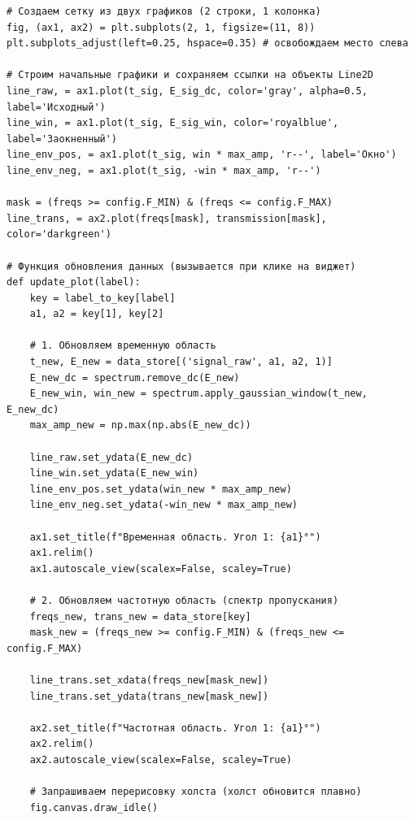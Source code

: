 \begin{listing}[H]
	\caption{Логика обновления сетки графиков ()}
	\begin{verbatim}
# Создаем сетку из двух графиков (2 строки, 1 колонка)
fig, (ax1, ax2) = plt.subplots(2, 1, figsize=(11, 8))
plt.subplots_adjust(left=0.25, hspace=0.35) # освобождаем место слева

# Строим начальные графики и сохраняем ссылки на объекты Line2D
line_raw, = ax1.plot(t_sig, E_sig_dc, color='gray', alpha=0.5, label='Исходный')
line_win, = ax1.plot(t_sig, E_sig_win, color='royalblue', label='Заокненный')
line_env_pos, = ax1.plot(t_sig, win * max_amp, 'r--', label='Окно')
line_env_neg, = ax1.plot(t_sig, -win * max_amp, 'r--')

mask = (freqs >= config.F_MIN) & (freqs <= config.F_MAX)
line_trans, = ax2.plot(freqs[mask], transmission[mask], color='darkgreen')

# Функция обновления данных (вызывается при клике на виджет)
def update_plot(label):
    key = label_to_key[label]
    a1, a2 = key[1], key[2]
    
    # 1. Обновляем временную область
    t_new, E_new = data_store[('signal_raw', a1, a2, 1)]
    E_new_dc = spectrum.remove_dc(E_new)
    E_new_win, win_new = spectrum.apply_gaussian_window(t_new, E_new_dc)
    max_amp_new = np.max(np.abs(E_new_dc))
    
    line_raw.set_ydata(E_new_dc)
    line_win.set_ydata(E_new_win)
    line_env_pos.set_ydata(win_new * max_amp_new)
    line_env_neg.set_ydata(-win_new * max_amp_new)
    
    ax1.set_title(f"Временная область. Угол 1: {a1}°")
    ax1.relim()
    ax1.autoscale_view(scalex=False, scaley=True)
    
    # 2. Обновляем частотную область (спектр пропускания)
    freqs_new, trans_new = data_store[key]
    mask_new = (freqs_new >= config.F_MIN) & (freqs_new <= config.F_MAX)
    
    line_trans.set_xdata(freqs_new[mask_new])
    line_trans.set_ydata(trans_new[mask_new])
    
    ax2.set_title(f"Частотная область. Угол 1: {a1}°")
    ax2.relim()
    ax2.autoscale_view(scalex=False, scaley=True)
    
    # Запрашиваем перерисовку холста (холст обновится плавно)
    fig.canvas.draw_idle()
	\end{verbatim}
\end{listing}



